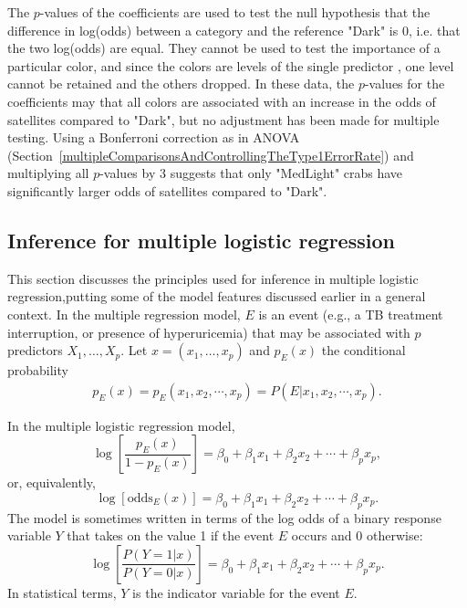The $p$-values of the coefficients are used to test the null hypothesis that the difference in log(odds) between a category and the reference "Dark" is 0, i.e. that the two log(odds) are equal.  They cannot be used to test the importance of a particular color, and since the colors are levels of the single predictor , one level cannot be retained and the others dropped.  In these data, the $p$-values for the coefficients may that all colors are associated with an increase in the odds of satellites compared to "Dark", but no adjustment has been made for multiple testing.  Using a Bonferroni correction as in ANOVA (Section~\ref{multipleComparisonsAndControllingTheType1ErrorRate}) and multiplying all $p$-values by 3 suggests that only "MedLight" crabs have significantly larger odds of satellites compared to "Dark".




\subsection{Inference for multiple logistic regression}
\label{inferenceMultipleLogisticRegression}

This section discusses the principles used for inference in multiple logistic regression,putting some of the model features discussed earlier in a general context. In the multiple regression model, $E$ is an event (e.g., a TB treatment interruption, or presence of hyperuricemia) that may be associated with $p$ predictors $X_1, \ldots, X_p$. Let $x = (x_1,\ldots,x_p)$ and $p_E(x)$ the conditional probability
\begin{align*}
  p_E(x) = p_E(x_1, x_2,\cdots, x_p) = P(E| x_1, x_2,\cdots,x_p).
\end{align*}

In the multiple logistic regression model,
\[
 \log\left[\frac{p_E(x)}{1 - p_E(x)}\right] = \beta_0 + \beta_1 x_1 +
      \beta_2 x_2 + \cdots + \beta_p x_p,
\]
or, equivalently,
\[
  \log\left[\text{odds}_E(x)\right] = \beta_0 + \beta_1 x_1 +
      \beta_2 x_2 + \cdots + \beta_p x_p.
\]
The model is sometimes written in terms of the log odds of a binary response variable $Y$ that takes on the value 1 if the event $E$ occurs and 0 otherwise:
\[
  \log\left[\frac{P(Y = 1|x)}{P(Y = 0|x)}\right] = \beta_0 + \beta_1 x_1 +
      \beta_2 x_2 + \cdots + \beta_p x_p.
\]
In statistical terms, $Y$ is the indicator variable for the event $E$.


